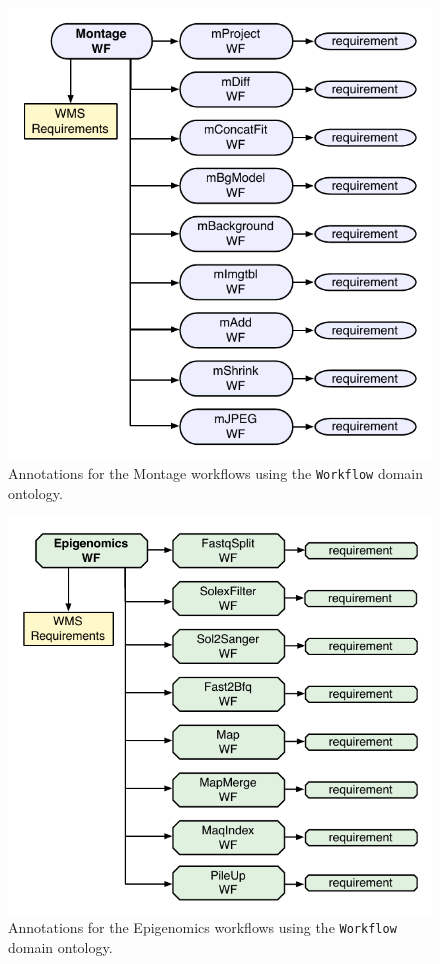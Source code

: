 \begin{figure}[!t]
	\centering
	\includegraphics[width=.85\linewidth]{figures/annotations-montage}
	\caption{Annotations for the Montage workflows using the \texttt{Workflow} domain ontology.}
	\label{fig:annotations-montage}
\end{figure}


\begin{figure}[!t]
	\centering
	\includegraphics[width=.85\linewidth]{figures/annotations-genome}
	\caption{Annotations for the Epigenomics workflows using the \texttt{Workflow} domain ontology.}
	\label{fig:annotations-genome}
\end{figure}


